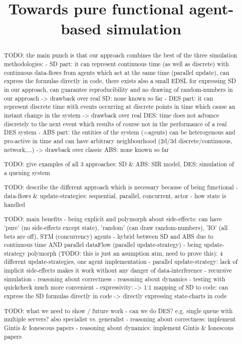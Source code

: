 \documentclass[10pt, onecolumn, conference]{../../../templates/IEEEtran/IEEEtran}
\title{Towards pure functional agent-based simulation}
\author{
	\IEEEauthorblockN{Jonathan Thaler}
	\IEEEauthorblockA{School of Computer Science\\
		University of Nottingham\\
		jonathan.thaler@nottingham.ac.uk}
		
	\and
		
	\IEEEauthorblockN{Peer-Olaf Siebers}
	\IEEEauthorblockA{School of Computer Science\\
		University of Nottingham\\
		peer-olaf.siebers@nottingham.ac.uk}
}
\begin{document}
\maketitle 

\begin{abstract}
TODO: the main punch is that our approach combines the best of the three simulation methodologies:
	- SD part: 	it can represent continuous time (as well as discrete) with continuous data-flows from agents which act at the same time (parallel update), can express the formulas directly in code, there exists also a small EDSL for expressing SD in our approach, can guarantee reproducibility and no drawing of random-numbers in our approach
		-> drawback over real SD: none known so far 
	- DES part: it can represent discrete time with events occurring at discrete points in time which cause an instant change in the system
		-> drawback over real DES: time does not advance discretely to the next event which results of course not in the performance of a real DES system
	- ABS part:	the entities of the system (=agents) can be heterogenous and pro-active in time and can have arbitrary neighbourhood (2d/3d discrete/continuous, network,...)
		-> drawback over classic ABS: none known so far 

TODO: give examples of all 3 approaches: SD \& ABS: SIR model, DES: simulation of a queuing system

TODO: describe the different approach which is necessary because of being functional 
	- data-flows \& update-strategies: sequential, parallel, concurrent, actor
	- how state is handled

TODO: main benefits
	- being explicit and polymorph about side-effects: can have 'pure' (no side-effects except state), 'random' (can draw random-numbers), 'IO' (all bets are off), STM (concurrency) agents
	- hybrid between SD and ABS due to continuous time AND parallel dataFlow (parallel update-strategy)
	- being update-strategy polymorph (TODO: this is just an asumption atm, need to prove this): 4 different update-strategies, one agent implementation
	- parallel update-strategy: lack of implicit side-effects makes it work without any danger of data-interference
	- recursive simulation
	- reasoning about correctness
	- reasoning about dynamics 
	- testing with quickcheck much more convenient
	- expressivity:
		-> 1:1 mapping of SD to code: can express the SD formulas directly in code
		-> directly expressing state-charts in code
	
TODO: what we need to show / future work
	- can we do DES? e.g. single queue with multiple servers? also specialist vs. generalist
	- reasoning about correctness: implement Gintis \& Ionescous papers 
	- reasoning about dynamics: implement Gintis \& Ionescous papers
	

\end{abstract}
\end{document}
